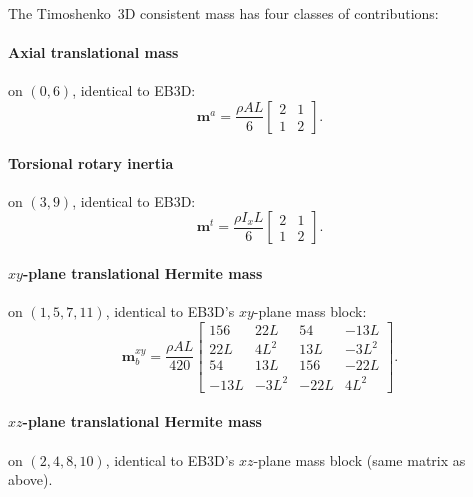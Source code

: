 \documentclass[11pt,a4paper]{article}
\newcommand{\bmath}[1]{\boldsymbol{#1}}
\begin{document}
The Timoshenko~3D consistent mass has four classes of contributions:

\paragraph{Axial translational mass} on $(0, 6)$, identical to EB3D:
\[
\bmath{m}^a = \dfrac{\rho A L}{6}\begin{bmatrix} 2 & 1 \\ 1 & 2 \end{bmatrix}.
\]

\paragraph{Torsional rotary inertia} on $(3, 9)$, identical to EB3D:
\[
\bmath{m}^t = \dfrac{\rho I_x L}{6}\begin{bmatrix} 2 & 1 \\ 1 & 2 \end{bmatrix}.
\]

\paragraph{$xy$-plane translational Hermite mass} on $(1, 5, 7, 11)$, identical to EB3D's $xy$-plane mass block:
\[
\bmath{m}_b^{xy} = \dfrac{\rho A L}{420}
\begin{bmatrix}
156 & 22L & 54 & -13L \\
22L & 4L^2 & 13L & -3L^2 \\
54  & 13L & 156 & -22L \\
-13L & -3L^2 & -22L & 4L^2
\end{bmatrix}.
\]

\paragraph{$xz$-plane translational Hermite mass} on $(2, 4, 8, 10)$, identical to EB3D's $xz$-plane mass block (same matrix as above).
\end{document}
